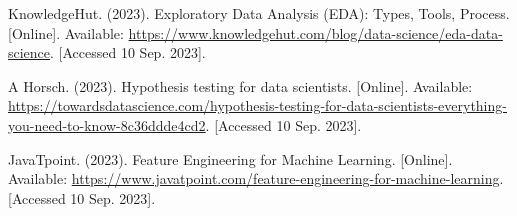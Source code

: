 \documentclass[journal]{IEEEtai}
\begin{document}
\def\refname{}
\begin{thebibliography}{34}\vspace*{-12pt}
 KnowledgeHut. (2023). Exploratory Data Analysis (EDA): Types, Tools, Process. [Online]. Available: \url{https://www.knowledgehut.com/blog/data-science/eda-data-science}. [Accessed 10 Sep. 2023].

 A Horsch. (2023). Hypothesis testing for data scientists. [Online]. Available: \url{https://towardsdatascience.com/hypothesis-testing-for-data-scientists-everything-you-need-to-know-8c3}\break\url{6ddde4cd2}. [Accessed 10 Sep. 2023].

 JavaTpoint. (2023). Feature Engineering for Machine Learning. [Online]. Available: \url{https://www.javatpoint.com/feature-engineering-for-machine-learning}. [Accessed 10 Sep. 2023].
\end{thebibliography}











\end{document}
